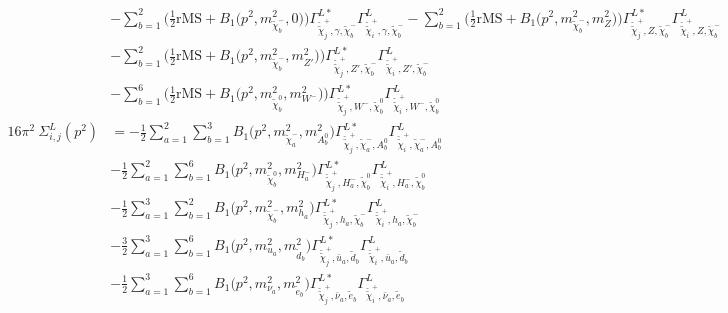 \begin{itemize}
\begin{align}
 &- \sum_{b=1}^{2}\Big(\frac{1}{2} \text{rMS}  + {B_1\Big(p^{2},m^2_{\tilde{\chi}^-_{{b}}},0\Big)}\Big){\Gamma^{L*}_{\check{\tilde{\chi}}^+_{{j}},\gamma,\tilde{\chi}^-_{{b}}}} {\Gamma^L_{\check{\tilde{\chi}}^+_{{i}},\gamma,\tilde{\chi}^-_{{b}}}}  - \sum_{b=1}^{2}\Big(\frac{1}{2} \text{rMS}  + {B_1\Big(p^{2},m^2_{\tilde{\chi}^-_{{b}}},m^2_{Z}\Big)}\Big){\Gamma^{L*}_{\check{\tilde{\chi}}^+_{{j}},Z,\tilde{\chi}^-_{{b}}}} {\Gamma^L_{\check{\tilde{\chi}}^+_{{i}},Z,\tilde{\chi}^-_{{b}}}}  \nonumber \\ 
 &- \sum_{b=1}^{2}\Big(\frac{1}{2} \text{rMS}  + {B_1\Big(p^{2},m^2_{\tilde{\chi}^-_{{b}}},m^2_{{Z'}}\Big)}\Big){\Gamma^{L*}_{\check{\tilde{\chi}}^+_{{j}},{Z'},\tilde{\chi}^-_{{b}}}} {\Gamma^L_{\check{\tilde{\chi}}^+_{{i}},{Z'},\tilde{\chi}^-_{{b}}}}  \nonumber \\ 
 &- \sum_{b=1}^{6}\Big(\frac{1}{2} \text{rMS}  + {B_1\Big(p^{2},m^2_{\tilde{\chi}^0_{{b}}},m^2_{W^-}\Big)}\Big){\Gamma^{L*}_{\check{\tilde{\chi}}^+_{{j}},W^-,\tilde{\chi}^0_{{b}}}} {\Gamma^L_{\check{\tilde{\chi}}^+_{{i}},W^-,\tilde{\chi}^0_{{b}}}}  \\ 
16\pi^2 \ \Sigma^L_{i,j}(p^2) &= -\frac{1}{2} \sum_{a=1}^{2}\sum_{b=1}^{3}{B_1\Big(p^{2},m^2_{\tilde{\chi}^-_{{a}}},m^2_{A^0_{{b}}}\Big)} {\Gamma^{L*}_{\check{\tilde{\chi}}^+_{{j}},\tilde{\chi}^-_{{a}},A^0_{{b}}}} {\Gamma^L_{\check{\tilde{\chi}}^+_{{i}},\tilde{\chi}^-_{{a}},A^0_{{b}}}}  \nonumber \\ 
 &-\frac{1}{2} \sum_{a=1}^{2}\sum_{b=1}^{6}{B_1\Big(p^{2},m^2_{\tilde{\chi}^0_{{b}}},m^2_{H^-_{{a}}}\Big)} {\Gamma^{L*}_{\check{\tilde{\chi}}^+_{{j}},H^-_{{a}},\tilde{\chi}^0_{{b}}}} {\Gamma^L_{\check{\tilde{\chi}}^+_{{i}},H^-_{{a}},\tilde{\chi}^0_{{b}}}}  \nonumber \\ 
 &-\frac{1}{2} \sum_{a=1}^{3}\sum_{b=1}^{2}{B_1\Big(p^{2},m^2_{\tilde{\chi}^-_{{b}}},m^2_{h_{{a}}}\Big)} {\Gamma^{L*}_{\check{\tilde{\chi}}^+_{{j}},h_{{a}},\tilde{\chi}^-_{{b}}}} {\Gamma^L_{\check{\tilde{\chi}}^+_{{i}},h_{{a}},\tilde{\chi}^-_{{b}}}}  \nonumber \\ 
 &-\frac{3}{2} \sum_{a=1}^{3}\sum_{b=1}^{6}{B_1\Big(p^{2},m^2_{u_{{a}}},m^2_{\tilde{d}_{{b}}}\Big)} {\Gamma^{L*}_{\check{\tilde{\chi}}^+_{{j}},\bar{u}_{{a}},\tilde{d}_{{b}}}} {\Gamma^L_{\check{\tilde{\chi}}^+_{{i}},\bar{u}_{{a}},\tilde{d}_{{b}}}}  \nonumber \\ 
 &-\frac{1}{2} \sum_{a=1}^{3}\sum_{b=1}^{6}{B_1\Big(p^{2},m^2_{\nu_{{a}}},m^2_{\tilde{e}_{{b}}}\Big)} {\Gamma^{L*}_{\check{\tilde{\chi}}^+_{{j}},\bar{\nu}_{{a}},\tilde{e}_{{b}}}} {\Gamma^L_{\check{\tilde{\chi}}^+_{{i}},\bar{\nu}_{{a}},\tilde{e}_{{b}}}}  \nonumber \\ 

\end{align}
\end{itemize}
